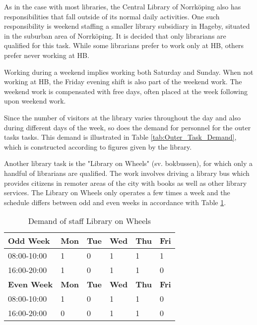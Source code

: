 As in the case with most libraries, the Central Library of Norrköping also has responsibilities that fall outside of its normal daily activities. One such responsibility is weekend staffing a smaller library subsidiary in Hageby, situated in the suburban area of Norrköping. It is decided that only librarians are qualified for this task. While some librarians prefer to work only at HB, others prefer never working at HB. 

Working during a weekend implies working both Saturday and Sunday. When not working at HB, the Friday evening shift is also part of the weekend work. The weekend work is compensated with free days, often placed at the week following upon weekend work.


Since the number of visitors at the library varies throughout the day and also during different days of the week, so does the demand for personnel for the outer tasks tasks. This demand is illustrated in Table \ref{tab:Outer_Task_Demand}, which is constructed according to figures given by the library. 

Another library task is the "Library on Wheels" (sv. bokbussen), for which only a handful of librarians are qualified. The work involves driving a library bus which provides citizens in remoter areas of the city with books as well as other library services. The Library on Wheels only operates a few times a week and the schedule differs between odd and even weeks in accordance with Table \ref{tab:LOW_Demand}.

\begin{table}[ht]
\centering
\caption{Demand of staff Library on Wheels}
\label{tab:LOW_Demand}
\begin{tabularx}{0.80\textwidth}{|l|X|X|X|X|X|}
\hline
 \textbf{Odd Week} & \textbf{Mon} & \textbf{Tue} & \textbf{Wed} & \textbf{Thu} & \textbf{Fri} 
 \\ \hline 
\rowcolor{Gray} 
08:00-10:00 & 1 & 0 & 1 & 1 & 1 
\\ \hline 
\rowcolor{Gray} 
16:00-20:00 & 1 & 0 & 1 & 1 & 0 
\\ \hline 
 \textbf{Even Week} & \textbf{Mon} & \textbf{Tue} & \textbf{Wed} & \textbf{Thu} & \textbf{Fri} 
 \\ \hline 
\rowcolor{Gray} 
08:00-10:00 & 1 & 0 & 1 & 1 & 0 
\\ \hline 
\rowcolor{Gray} 
16:00-20:00 & 0 & 0 & 1 & 1 & 0 
\\ \hline 
\end{tabularx}
\end{table}


